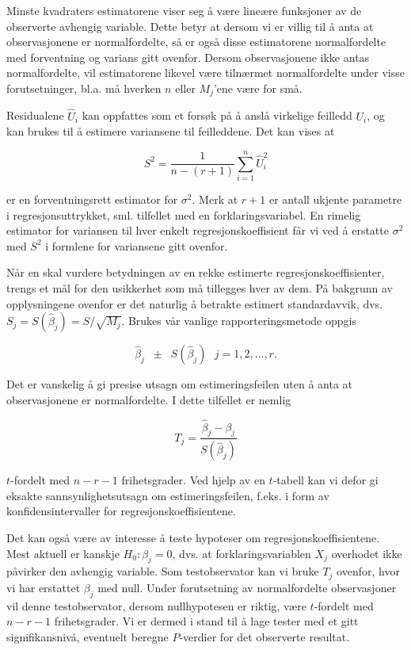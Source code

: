 Minste kvadraters estimatorene viser seg å være lineære 
funksjoner av de observerte avhengig variable.  Dette betyr at dersom vi er
villig til å anta at observasjonene er normalfordelte, så er også
disse estimatorene normalfordelte med forventning og varians gitt ovenfor.  
Dersom observasjonene ikke antas normalfordelte, vil estimatorene likevel
være tilnærmet normalfordelte under visse forutsetninger, bl.a. må
hverken $n$ eller $M_j$'ene være for små.

Residualene $\hat{U}_i$ kan oppfattes som et
forsøk på å anslå virkelige feilledd $U_i$, og kan brukes til
 å estimere variansene til feilleddene. Det kan vises at

\[ S^2=\frac{1}{n-(r+1)} \sum_{i=1}^{n} {\hat{U}}_i^2    \]

\noindent er en forventningsrett estimator for ${\sigma}^2$.  Merk at $r+1$ er
 antall ukjente
parametre i regresjonsuttrykket, sml. tilfellet med en forklaringsvariabel.
En rimelig estimator for variansen til hver enkelt regresjonskoeffisient
får vi ved å erstatte ${\sigma}^2$ med $S^2$ i formlene for
variansene gitt ovenfor.

Når en skal vurdere betydningen av en rekke estimerte 
regresjons\-koef\-fisienter, trengs et mål for den usikkerhet som må
tillegges hver av dem.  På bakgrunn av opplysningene ovenfor er det
naturlig å betrakte estimert standardavvik, dvs.
$S_j=S({\hat{\beta}}_j)=S/\sqrt{M_j}$.
Brukes vår vanlige rappor\-terings\-metode oppgis

\[{\hat{\beta}}_j \; \; \pm \; \; S({\hat{\beta}}_j)\mbox{\ \ \ \ }j=1,2,\ldots, r. \] 

\noindent Det er vanskelig å gi presise utsagn om estimeringsfeilen uten
å anta at observasjonene er normalfordelte.  I dette tilfellet er nemlig 

\[  T_j=\frac{{\hat{\beta}}_j-{\beta}_j}{S({\hat{\beta}}_j)}    \] 


\noindent $t$-fordelt med $n-r-1$ frihetsgrader. Ved hjelp av en $t$-tabell kan
vi defor gi eksakte sannsynlighetsutsagn om estimeringsfeilen, f.eks. i form
av konfidensintervaller for regresjonskoeffisientene.

Det kan også være av interesse å teste hypoteser om 
regresjonskoeffisientene. Mest aktuell er kanskje $H_0:{\beta}_j=0$, dvs. at
forklaringsvariablen $X_j$ overhodet ikke påvirker den avhengig variable.
Som testobservator kan vi bruke $T_j$ ovenfor, hvor vi har erstattet ${\beta}_j
$ med null.  Under forutsetning av normalfordelte observasjoner vil denne 
testobservator, dersom nullhypotesen er riktig, være $t$-fordelt med
$n-r-1$ frihetsgrader.  Vi er dermed i stand til å lage tester med et
gitt signifikansnivå, eventuelt beregne $P$-verdier for det observerte
resultat.

